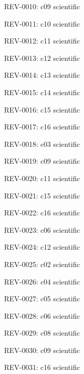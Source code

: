 \documentclass[10pt,openany]{book}
\begin{document}
\noindent REV-0010: c09 scientific\par

\noindent REV-0011: c10 scientific\par

\noindent REV-0012: c11 scientific\par

\noindent REV-0013: c12 scientific\par

\noindent REV-0014: c13 scientific\par

\noindent REV-0015: c14 scientific\par

\noindent REV-0016: c15 scientific\par

\noindent REV-0017: c16 scientific\par

\noindent REV-0018: c03 scientific\par

\noindent REV-0019: c09 scientific\par

\noindent REV-0020: c11 scientific\par

\noindent REV-0021: c15 scientific\par

\noindent REV-0022: c16 scientific\par

\noindent REV-0023: c06 scientific\par

\noindent REV-0024: c12 scientific\par

\noindent REV-0025: c02 scientific\par

\noindent REV-0026: c04 scientific\par

\noindent REV-0027: c05 scientific\par

\noindent REV-0028: c06 scientific\par

\noindent REV-0029: c08 scientific\par

\noindent REV-0030: c09 scientific\par

\noindent REV-0031: c16 scientific\par
\end{document}
